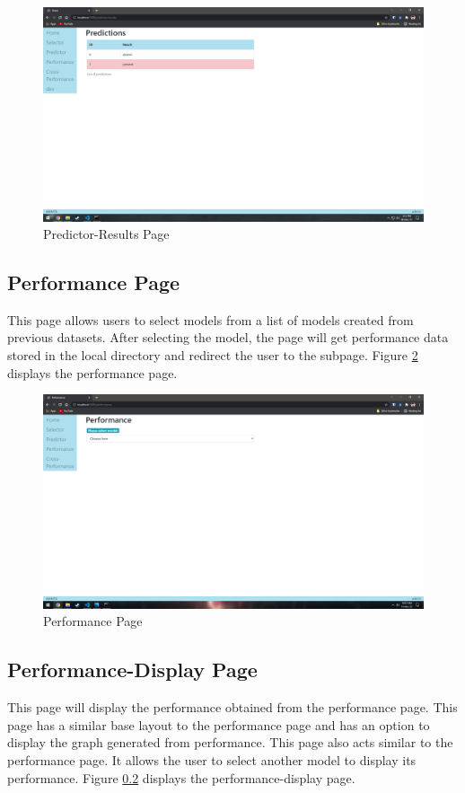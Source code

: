 \begin{figure}[H]
  \centering
  \includegraphics[width=0.7\columnwidth]{media/website/pages/03_predictor_results.png}
  \caption{Predictor-Results Page}
  \label{fig:web_predictor_results_page}
\end{figure}

\subsection{Performance Page} \label{subsec:performance_page}
This page allows users to select models from a list of models created from previous datasets. After selecting the model, the page will get performance data stored in the local directory and redirect the user to the subpage. Figure \ref{fig:web_performance_page} displays the performance page.

\begin{figure}[H]
  \centering
  \includegraphics[width=0.7\columnwidth]{media/website/pages/04_Performance.png}
  \caption{Performance Page}
  \label{fig:web_performance_page}
\end{figure}

\subsection{Performance-Display Page} \label{subsec:performance_display_page}
This page will display the performance obtained from the performance page. This page has a similar base layout to the performance page and has an option to display the graph generated from performance. This page also acts similar to the performance page. It allows the user to select another model to display its performance. Figure \ref{subsec:performance_display_page} displays the performance-display page.

